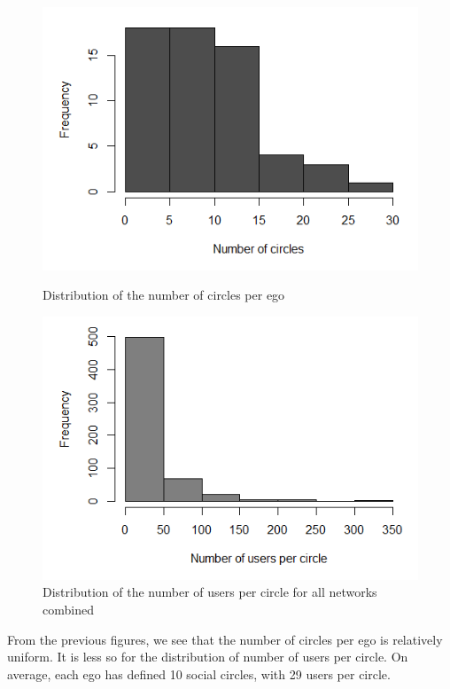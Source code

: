 \documentclass[11pt]{article}       %
\begin{document}
\begin{figure}[H]
\centering
\begin{minipage}[b]{0.47\linewidth}
\vspace{0pt}
\includegraphics[width=\linewidth]{numcircles.png}
\caption{Distribution of the number of circles per ego}
\end{minipage}
\hspace{0.5cm}
\begin{minipage}[b]{0.47\linewidth}
\centering
\includegraphics[width=\linewidth]{userpercircle.png}
\caption{Distribution of the number of users per circle for all networks combined}
\end{minipage}
\end{figure}
\newpage

From the previous figures, we see that the number of circles per ego is relatively uniform. It is less so for the distribution of number of users per circle. On average, each ego has defined 10 social circles, with 29 users per circle.
\end{document}
